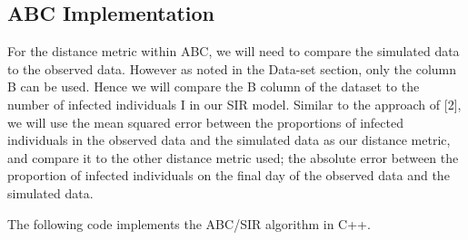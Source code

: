 \documentclass[
]{article}
\begin{document}
\subsection{ABC Implementation}\label{abc-implementation}

For the distance metric within ABC, we will need to compare the
simulated data to the observed data. However as noted in the Data-set
section, only the column B can be used. Hence we will compare the B
column of the dataset to the number of infected individuals I in our SIR
model. Similar to the approach of {[}2{]}, we will use the mean squared
error between the proportions of infected individuals in the observed
data and the simulated data as our distance metric, and compare it to
the other distance metric used; the absolute error between the
proportion of infected individuals on the final day of the observed data
and the simulated data.

The following code implements the ABC/SIR algorithm in C++.
\end{document}
